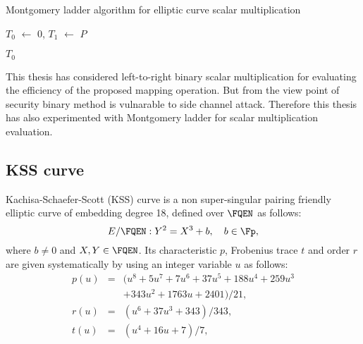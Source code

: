          \begin{algorithm}[H]
          \caption{Montgomery ladder algorithm for elliptic curve scalar multiplication}
          \label{alg:mont}
          \DontPrintSemicolon
          \hspace{-3ex}
          \;
          \hspace{-3ex}
           \;%
          \nl $T_0$ $ \leftarrow$ $0$, $T_1$ $\leftarrow$ $P$ \;
          \nl {} {\;
         
                    {
                }
          }\;
          \nl {} $T_0$\;
        \end{algorithm}
        This thesis has considered left-to-right binary scalar multiplication for evaluating the efficiency of the proposed mapping operation. But from the view point of security binary method is vulnarable to side channel attack. Therefore this thesis has also experimented with Montgomery ladder \cite{Silverman} for scalar multiplication evaluation.
        
        \subsection{KSS curve}
        Kachisa-Schaefer-Scott (KSS) curve \cite{EPRINT:KacSchSco07} is a non super-singular pairing friendly elliptic curve of embedding degree 18, defined over $\FQEN$ as follows: 
        \begin{equation}\label{eq:KSS_curve}
        E/\FQEN:Y^2=X^3+b, \quad \mbox{$b \in \Fp$},
        \end{equation}
        where $b \neq 0$ and $X,Y \in \FQEN$. Its characteristic $p$, Frobenius trace $t$ and order $r$ are given systematically by using an integer variable $u$ as follows:
        \begin{subequations}
        \begin{eqnarray}
        p(u) &= & (u^8 +5u^7 +7u^6 +37u^5 +188u^4 +259u^3 \nonumber \\
        & & + 343u^2 +1763u+2401)/21,\\\label{eq:kss_char}
        r(u) &= &(u^6 + 37u^3 + 343)/343,\label{eq:kss_degree}  \\
        t(u) &=& (u^4 + 16u + 7)/7, \label{eq:kss_trace} 
        \end{eqnarray}
        \end{subequations} 
        
